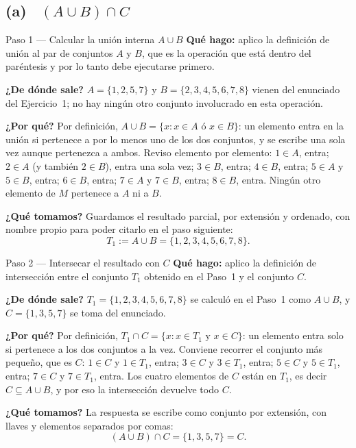 \documentclass[11pt]{article}
\begin{document}
\subsection*{(a) \ $(A\cup B)\cap C$}

\begin{paso}{Paso 1 --- Calcular la unión interna $A\cup B$}
\textbf{Qué hago:} aplico la definición de unión al par de conjuntos $A$ y $B$, que es la
operación que está dentro del paréntesis y por lo tanto debe ejecutarse primero.

\textbf{¿De dónde sale?} $A=\{1,2,5,7\}$ y $B=\{2,3,4,5,6,7,8\}$ vienen del enunciado del
Ejercicio~1; no hay ningún otro conjunto involucrado en esta operación.

\textbf{¿Por qué?} Por definición, $A\cup B=\{x: x\in A \text{ ó } x\in B\}$: un elemento
entra en la unión si pertenece a por lo menos uno de los dos conjuntos, y se escribe una sola
vez aunque pertenezca a ambos. Reviso elemento por elemento:
$1\in A$, entra; $2\in A$ (y también $2\in B$), entra una sola vez; $3\in B$, entra;
$4\in B$, entra; $5\in A$ y $5\in B$, entra; $6\in B$, entra; $7\in A$ y $7\in B$, entra;
$8\in B$, entra. Ningún otro elemento de $M$ pertenece a $A$ ni a $B$.

\textbf{¿Qué tomamos?} Guardamos el resultado parcial, por extensión y ordenado, con nombre
propio para poder citarlo en el paso siguiente:
\[
T_1:=A\cup B=\{1,2,3,4,5,6,7,8\}.
\]
\end{paso}

\begin{paso}{Paso 2 --- Intersecar el resultado con $C$}
\textbf{Qué hago:} aplico la definición de intersección entre el conjunto $T_1$ obtenido en
el Paso~1 y el conjunto $C$.

\textbf{¿De dónde sale?} $T_1=\{1,2,3,4,5,6,7,8\}$ se calculó en el Paso~1 como $A\cup B$, y
$C=\{1,3,5,7\}$ se toma del enunciado.

\textbf{¿Por qué?} Por definición, $T_1\cap C=\{x: x\in T_1 \text{ y } x\in C\}$: un elemento
entra solo si pertenece a los dos conjuntos a la vez. Conviene recorrer el conjunto más
pequeño, que es $C$: $1\in C$ y $1\in T_1$, entra; $3\in C$ y $3\in T_1$, entra; $5\in C$ y
$5\in T_1$, entra; $7\in C$ y $7\in T_1$, entra. Los cuatro elementos de $C$ están en $T_1$,
es decir $C\subseteq A\cup B$, y por eso la intersección devuelve todo $C$.

\textbf{¿Qué tomamos?} La respuesta se escribe como conjunto por extensión, con llaves y
elementos separados por comas:
\[
(A\cup B)\cap C=\{1,3,5,7\}=C.
\]
\end{paso}
\end{document}
